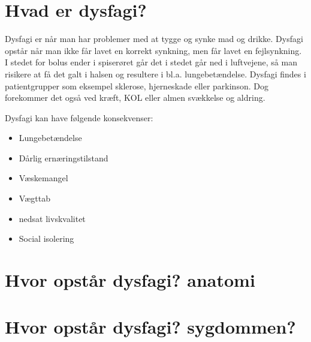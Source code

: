 \documentclass[main.tex]{subfiles}
\begin{document}
\section*{Hvad er dysfagi?}
Dysfagi er når man har problemer med at tygge og synke mad og drikke. Dysfagi opstår når man ikke får lavet en korrekt synkning, men får lavet en fejlsynkning. I stedet for bolus ender i spiserøret går det i stedet går ned i luftvejene, så man risikere at få det galt i halsen og resultere i bl.a. lungebetændelse. Dysfagi findes i patientgrupper som eksempel sklerose, hjerneskade eller parkinson. Dog forekommer det også ved kræft, KOL eller almen svækkelse og aldring.\cite{SallyRefsgaardTinesterbyKristensen2015DysfagiKommune}

Dysfagi kan have følgende konsekvenser:
\begin{itemize}
\item Lungebetændelse
\item Dårlig ernæringstilstand
\item Væskemangel
\item Vægttab
\item nedsat livskvalitet
\item Social isolering

\end{itemize}






\section*{Hvor opstår dysfagi? anatomi}


\section*{Hvor opstår dysfagi? sygdommen?}
\end{document}
